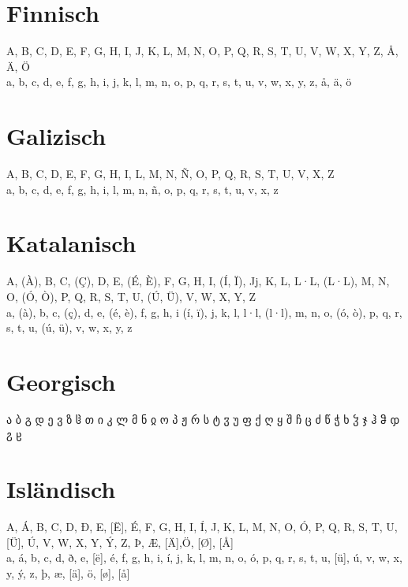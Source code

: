 \documentclass{scrartcl}
\begin{document}
\section{Finnisch}
A, B, C, D, E, F, G, H, I, J, K, L, M, N, O, P, Q, R, S, T, U, V, W, X, Y, Z, Å, Ä, Ö \\
a, b, c, d, e, f, g, h, i, j, k, l, m, n, o, p, q, r, s, t, u, v, w, x, y, z, å, ä, ö

\section{Galizisch}
A, B, C, D, E, F, G, H, I, L, M, N, Ñ, O, P, Q, R, S, T, U, V, X, Z \\
a, b, c, d, e, f, g, h, i, l, m, n, ñ, o, p, q, r, s, t, u, v, x, z

\section{Katalanisch}
A, (À), B, C, (Ç), D, E, (É, È), F, G, H, I, (Í, Ï), Jj, K, L, L·L, (L·L), M, N, O, (Ó, Ò), P, Q, R, S, T, U, (Ú, Ü), V, W, X, Y, Z \\
a, (à), b, c, (ç), d, e, (é, è), f, g, h, i (í, ï), j, k, l, l·l, (l·l), m, n, o, (ó, ò), p, q, r, s, t, u, (ú, ü), v, w, x, y, z 

\section{Georgisch} 
ა ბ გ დ ე ვ ზ ჱ თ ი კ ლ მ ნ ჲ ო პ ჟ რ ს ტ ჳ უ ფ ქ ღ ყ შ ჩ ც ძ წ ჭ ხ ჴ ჯ ჰ ჵ ჶ ჷ ჸ

\section{Isländisch}
A, Á, B, C, D, Ð, E, [Ë], É, F, G, H, I, Í, J, K, L, M, N, O, Ó, P, Q, R, S, T, U, [Ü], Ú, V, W, X, Y, Ý, Z, Þ, Æ, [Ä],Ö, [Ø], [Å] \\
a, á, b, c, d, ð, e, [ë], é, f, g, h, i, í, j, k, l, m, n, o, ó, p, q, r, s, t, u, [ü], ú, v, w, x, y, ý, z, þ, æ, [ä], ö, [ø], [å]
\end{document}
